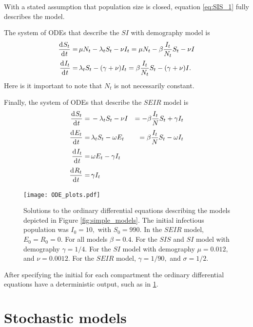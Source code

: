 With a stated assumption that population size is closed, equation \ref{eq:SIS_1} fully describes the model.

The system of ODEs that describe the $SI$ with demography model is \begin{align}
    \frac{\diff S_t}{\diff t} = & \, \mu N_t - \lambda_t S_t - \nu I_t = \mu N_t -\beta \frac{I_t}{N_t}S_t - \nu I \label{eq:SI_1}   \\
    \frac{\diff I_t}{\diff t} = & \, \lambda_t S_t - (\gamma + \nu)I_t = \beta \frac{I_t}{N_t}S_t - (\gamma + \nu) I\label{eq:SI_2}.
\end{align} Here is it important to note that $N_t$ is not necessarily constant.

Finally, the system of ODEs that describe the $SEIR$ model is \begin{align}
    \frac{\diff S_t}{\diff t} = & \, - \lambda_t S_t - \nu I                   & = -\beta \frac{I_t}{N}S_t + \gamma I_t \label{eq:SEIR_1} \\
    \frac{\diff E_t}{\diff t} = & \, \lambda_t S_t - \omega E_t                & = \beta \frac{I_t}{N}S_t - \omega I_t \label{eq:SEIR_2}  \\
    \frac{\diff I_t}{\diff t} = & \, \omega E_t - \gamma I_t \label{eq:SEIR_3}                                                            \\
    \frac{\diff R_t}{\diff t} = & \, \gamma I_t \label{eq:SEIR_4}
\end{align}

\begin{figure}[htbp]
    \centering
    \texttt{[image: ODE\_plots.pdf]}
    \caption{Solutions to the ordinary differential equations describing the models depicted in Figure \ref{fig:simple_models}. The initial infectious population was $I_0 = 10,$ with $S_0 = 990.$ In the $SEIR$ model, $E_0 = R_0 = 0.$ For all models $\beta = 0.4.$ For the $SIS$ and $SI$ model with demography $\gamma = 1/4.$ For the $SI$ model with demography $\mu = 0.012,$ and $\nu = 0.0012.$ For the $SEIR$ model, $\gamma = 1/90,$ and $\sigma = 1/2.$}\label{fig:ODE_outputs}
\end{figure}

After specifying the initial for each compartment the ordinary differential equations have a deterministic output, such as in \ref{fig:ODE_outputs}.

\section{Stochastic models}

